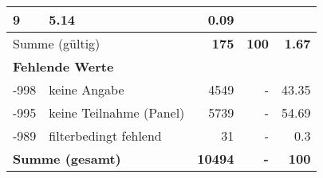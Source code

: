 \begin{longtable}{lXrrr}
       \num{9} &
       \num[round-mode=places,round-precision=2]{5.14} &
         \num[round-mode=places,round-precision=2]{0.09} \\
     \midrule
     \multicolumn{2}{l}{Summe (gültig)} &
       \textbf{\num{175}} &
     \textbf{\num{100}} &
       \textbf{\num[round-mode=places,round-precision=2]{1.67}} \\
     \multicolumn{5}{l}{\textbf{Fehlende Werte}}\\
       -998 &
       keine Angabe &
         \num{4549} &
        - &
         \num[round-mode=places,round-precision=2]{43.35} \\
       -995 &
       keine Teilnahme (Panel) &
         \num{5739} &
        - &
         \num[round-mode=places,round-precision=2]{54.69} \\
       -989 &
       filterbedingt fehlend &
         \num{31} &
        - &
         \num[round-mode=places,round-precision=2]{0.3} \\
     \midrule
     \multicolumn{2}{l}{\textbf{Summe (gesamt)}} &
          \textbf{\num{10494}} &
        \textbf{-} &
        \textbf{\num{100}} \\
     \bottomrule
     \end{longtable}
     

